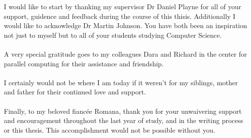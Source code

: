 
I would like to start by thanking my supervisor Dr Daniel Playne for all of your support, guidence and feedback during the course of this thisis. Additionally I would like to acknowledge Dr Martin Johnson. You have both been an inspiration not just to myself but to all of your students studying Computer Science. \\
\\
\noindent
A very special gratitude goes to my colleagues Dara and Richard in the center for parallel computing for their assistance and friendship. \\
\\
\noindent
I certainly would not be where I am today if it weren't for my siblings, mother and father for their continued love and support.\\
\\
\noindent
Finally, to my beloved fianc\'{e}e Romana, thank you for your unwaivering support and encouragement throughout the last year of study, and in the writing process or this thesis. This accomplishment would not be possible without you. 

